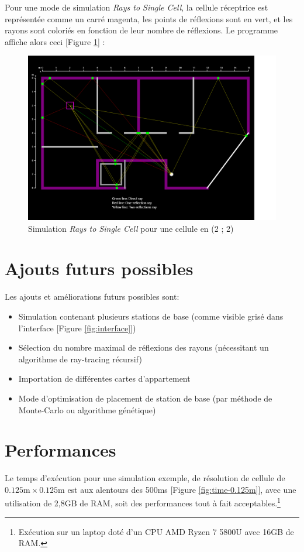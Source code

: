 Pour une mode de simulation \textit{Rays to Single Cell}, la cellule réceptrice est représentée comme un carré magenta, les points de réflexions sont en vert, et les rayons sont coloriés en fonction de leur nombre de réflexions. Le programme affiche alors ceci [Figure \ref{fig:simu-single-cell}] :
\begin{figure}[H]
    \centering
    \includegraphics[width=\textwidth]{latex/images/single-cell.png}
    \caption{Simulation \textit{Rays to Single Cell} pour une cellule en (2 ; 2)}
    \label{fig:simu-single-cell}
\end{figure}

\section{Ajouts futurs possibles}
Les ajouts et améliorations futurs possibles sont:
\begin{itemize}
    \item Simulation contenant plusieurs stations de base (comme visible grisé dans l'interface [Figure \ref{fig:interface}])
    \item Sélection du nombre maximal de réflexions des rayons (nécessitant un algorithme de ray-tracing récursif)
    \item Importation de différentes cartes d'appartement
    \item Mode d'optimisation de placement de station de base (par méthode de Monte-Carlo ou algorithme génétique)
\end{itemize}

\section{Performances}
Le temps d'exécution pour une simulation exemple, de résolution de cellule de $0.125\mathrm{m}\times0.125\mathrm{m}$ est aux alentours des 500ms [Figure \ref{fig:time-0.125m}], avec une utilisation de 2,8GB de RAM, soit des performances tout à fait acceptables.\footnote{Exécution sur un laptop doté d'un CPU AMD Ryzen 7 5800U avec 16GB de RAM.}

